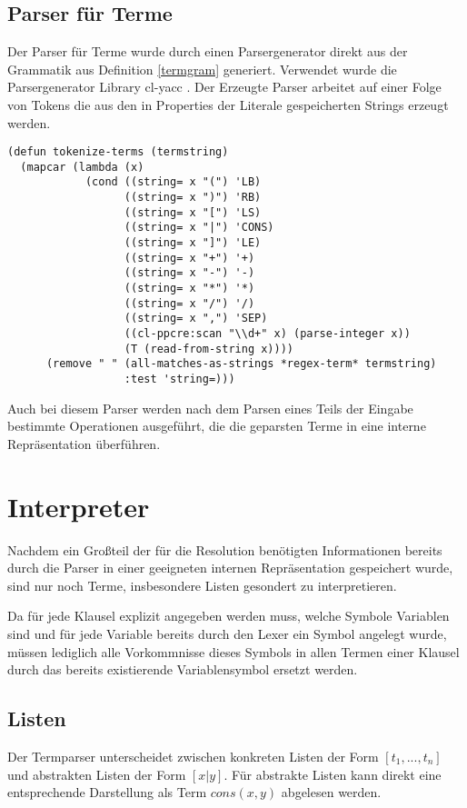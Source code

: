 \subsection{Parser für Terme}\label{termparser}
Der Parser für Terme wurde durch einen Parsergenerator direkt aus der Grammatik aus Definition \ref{termgram} generiert. Verwendet wurde die Parsergenerator Library cl-yacc \cite{cl-yacc}. Der Erzeugte Parser arbeitet auf einer Folge von Tokens die aus den in Properties der Literale gespeicherten Strings erzeugt werden.
\newpage

\begin{verbatim}
(defun tokenize-terms (termstring)
  (mapcar (lambda (x)
            (cond ((string= x "(") 'LB)
                  ((string= x ")") 'RB)
                  ((string= x "[") 'LS)
                  ((string= x "|") 'CONS)
                  ((string= x "]") 'LE)
                  ((string= x "+") '+)
                  ((string= x "-") '-)
                  ((string= x "*") '*)
                  ((string= x "/") '/)
                  ((string= x ",") 'SEP)
                  ((cl-ppcre:scan "\\d+" x) (parse-integer x))
                  (T (read-from-string x))))
	  (remove " " (all-matches-as-strings *regex-term* termstring) 
                  :test 'string=)))
\end{verbatim}

Auch bei diesem Parser werden nach dem Parsen eines Teils der Eingabe bestimmte Operationen ausgeführt, die die geparsten Terme in eine interne Repräsentation überführen.

\section{Interpreter}
Nachdem ein Großteil der für die Resolution benötigten Informationen bereits durch die Parser in einer geeigneten internen Repräsentation gespeichert wurde, sind nur noch Terme, insbesondere Listen gesondert zu interpretieren.

Da für jede Klausel explizit angegeben werden muss, welche Symbole Variablen sind und für jede Variable bereits durch den Lexer ein Symbol angelegt wurde, müssen lediglich alle Vorkommnisse dieses Symbols in allen Termen einer Klausel durch das bereits existierende Variablensymbol ersetzt werden.

\subsection{Listen}
Der Termparser unterscheidet zwischen konkreten Listen der Form $[t_1,...,t_n]$ und abstrakten Listen der Form $[x|y]$. Für abstrakte Listen kann direkt eine entsprechende Darstellung als Term $cons(x,y)$ abgelesen werden.

